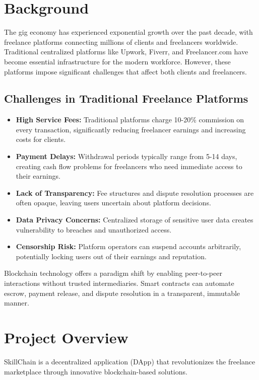 \section{Background}

The gig economy has experienced exponential growth over the past decade, with freelance platforms connecting millions of clients and freelancers worldwide. Traditional centralized platforms like Upwork, Fiverr, and Freelancer.com have become essential infrastructure for the modern workforce. However, these platforms impose significant challenges that affect both clients and freelancers.

\subsection{Challenges in Traditional Freelance Platforms}

\begin{itemize}[leftmargin=*]
    \item \textbf{High Service Fees:} Traditional platforms charge 10-20\% commission on every transaction, significantly reducing freelancer earnings and increasing costs for clients.
    \item \textbf{Payment Delays:} Withdrawal periods typically range from 5-14 days, creating cash flow problems for freelancers who need immediate access to their earnings.
    \item \textbf{Lack of Transparency:} Fee structures and dispute resolution processes are often opaque, leaving users uncertain about platform decisions.
    \item \textbf{Data Privacy Concerns:} Centralized storage of sensitive user data creates vulnerability to breaches and unauthorized access.
    \item \textbf{Censorship Risk:} Platform operators can suspend accounts arbitrarily, potentially locking users out of their earnings and reputation.
\end{itemize}

Blockchain technology offers a paradigm shift by enabling peer-to-peer interactions without trusted intermediaries. Smart contracts can automate escrow, payment release, and dispute resolution in a transparent, immutable manner.

\section{Project Overview}

SkillChain is a decentralized application (DApp) that revolutionizes the freelance marketplace through innovative blockchain-based solutions.

